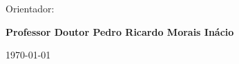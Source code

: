 \vspace{0,5cm}
\begin{center}
\begin{normalsize}
\begin{large}
Orientador:
\end{large}
\end{normalsize}
\end{center}

\vspace{0.2cm}
\begin{center}
\begin{large}
\textbf{Professor Doutor Pedro Ricardo Morais Inácio}
\end{large}
\end{center}

\vspace{0.5cm}
\begin{center}
\begin{normalsize}
\today
\end{normalsize}
\end{center}